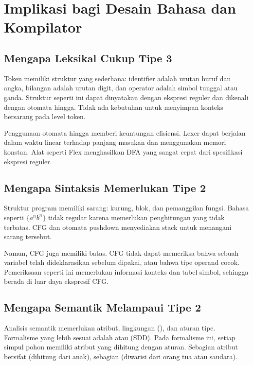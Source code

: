 \section{Implikasi bagi Desain Bahasa dan Kompilator}
\label{sec:ch04-implikasi}

\subsection{Mengapa Leksikal Cukup Tipe 3}

Token memiliki struktur yang sederhana: identifier adalah urutan
huruf dan angka, bilangan adalah urutan digit, dan operator adalah
simbol tunggal atau ganda. Struktur seperti ini dapat dinyatakan
dengan ekspresi reguler dan dikenali dengan otomata hingga. Tidak ada
kebutuhan untuk menyimpan konteks bersarang pada level token.

Penggunaan otomata hingga memberi keuntungan efisiensi. Lexer dapat
berjalan dalam waktu linear terhadap panjang masukan dan menggunakan
memori konstan. Alat seperti Flex menghasilkan DFA yang sangat cepat
dari spesifikasi ekspresi reguler.

\subsection{Mengapa Sintaksis Memerlukan Tipe 2}

Struktur program memiliki sarang: kurung, blok, dan pemanggilan
fungsi. Bahasa seperti \(\{a^n b^n\}\) tidak regular karena
memerlukan penghitungan yang tidak terbatas. CFG dan otomata pushdown
menyediakan stack untuk menangani sarang tersebut.

Namun, CFG juga memiliki batas. CFG tidak dapat memeriksa bahwa
sebuah variabel telah dideklarasikan sebelum dipakai, atau bahwa tipe
operand cocok. Pemeriksaan seperti ini memerlukan informasi konteks
dan tabel simbol, sehingga berada di luar daya ekspresif CFG.

\subsection{Mengapa Semantik Melampaui Tipe 2}

Analisis semantik memerlukan atribut, lingkungan (),
dan aturan tipe. Formalisme yang lebih sesuai adalah
 atau  (SDD).
Pada formalisme ini, setiap simpul pohon memiliki atribut yang
dihitung dengan aturan. Sebagian atribut bersifat
 (dihitung dari anak), sebagian
 (diwarisi dari orang tua atau saudara).


